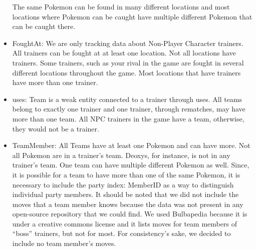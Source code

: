 \documentclass{article}
\begin{document}
\begin{itemize}
		The same Pokemon can be found in many different locations and
		most locations where Pokemon can be caught have multiple 
		different Pokemon that can be caught there.
	\item FoughtAt:
		We are only tracking data about Non-Player Character trainers.
		All trainers can be fought at at least one location.
		Not all locations have trainers. Some trainers, such as your
		rival in the game are fought in several different locations
		throughout the game.
		Most locations that have trainers have more than one trainer.
	\item uses:
		Team is a weak entity connected to a trainer through uses.
		All teams belong to exactly one trainer and one trainer,
		through rematches, may have more than one team.
		All NPC trainers in the game have a team,
		otherwise, they would not be a trainer.
	\item TeamMember:
		All Teams have at least one Pokemon and can have more.
		Not all Pokemon are in a trainer's team. Deoxys, for instance, is not
		in any trainer's team.
		One team can have multiple different Pokemon as well.
		Since, it is possible for a team to have more than one 
		of the same Pokemon, it is necessary to include the
		party index: MemberID as a way to distinguish 
		individual party members.
		It should be noted that we did not include 
		the moves that a team member knows because
		the data was not present in any open-source
		repository that we could find.
		We used Bulbapedia because it is under
		a creative commons license and it lists
		moves for team members of ``boss'' trainers,
		but not for most. For consistency's sake, we decided to include no
		team member's moves.
\end{itemize}
\end{document}
